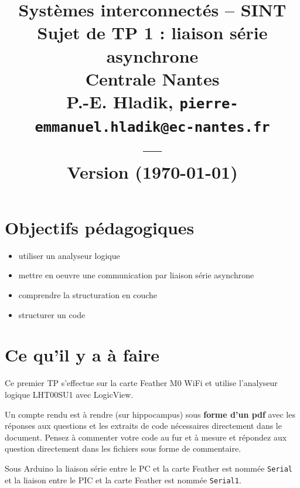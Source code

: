 \documentclass[11pt]{paper}
\title{{\Large Systèmes interconnectés -- SINT }\\
\vspace{-0.4em}
{\large Sujet de TP 1 : liaison série asynchrone}\\
{\small Centrale Nantes}\\
\small P.-E. Hladik, \small{\texttt{pierre-emmanuel.hladik@ec-nantes.fr}}\\
---\\
{\scriptsize  Version \version (\today)}\\
}
\begin{document}
\maketitle


  \section{Objectifs pédagogiques}

\begin{itemize}
	\item utiliser un analyseur logique
	\item mettre en oeuvre une communication par liaison série asynchrone
	\item comprendre la structuration en couche
	\item structurer un code
\end{itemize}

  \section{Ce qu'il y a à faire}

Ce premier TP s’effectue sur la carte Feather M0 WiFi et utilise l'analyseur logique LHT00SU1 avec LogicView.

Un compte rendu est à rendre (sur hippocampus) sous {\bf forme d'un pdf} avec les réponses aux questions et les extraits de code nécessaires directement dans le document. Pensez à commenter votre code au fur et à mesure et répondez aux question directement dans les fichiers sous forme de commentaire.

Sous Arduino la liaison série entre le PC et la carte Feather est nommée {\tt Serial} et la liaison entre le PIC et la carte Feather est nommée {\tt Serial1}.
\end{document}
